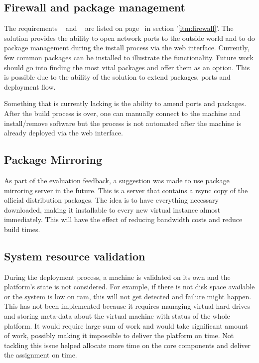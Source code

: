 \documentclass{article}
\begin{document}
\subsection{Firewall and package management}
The requirements ~ and ~ are listed on page~\pageref{itm:firewall} in section '\ref{itm:firewall}'.
The solution provides the ability to open network ports to the outside world and to do package management during the install process via the web interface. Currently, few common packages can be installed to illustrate the functionality. Future work should go into finding the most vital packages and offer them as an option. This is possible due to the ability of the solution to extend packages, ports and deployment flow.

Something that is currently lacking is the ability to amend ports and packages. After the build process is over, one can manually connect to the machine and install/remove software but the process is not automated after the machine is already deployed via the web interface.

\subsection{Package Mirroring}
As part of the evaluation feedback, a suggestion was made to use package mirroring server in the future. This is a server that contains a \gls{rsync} copy of the official distribution packages. The idea is to have everything necessary downloaded, making it installable to every new virtual instance almost immediately. This will have the effect of reducing bandwidth costs and reduce build times.

\subsection{System resource validation}
During the deployment process, a machine is validated on its own and the platform's state is not considered. For example, if there is not disk space available or the system is low on \gls{ram}, this will not get detected and failure might happen. This has not been implemented because it requires managing virtual hard drives and storing meta-data about the virtual machine with status of the whole platform. It would require large sum of work and would take significant amount of work, possibly making it impossible to deliver the platform on time.
Not tackling this issue helped allocate more time on the core components and deliver the assignment on time.
\end{document}
